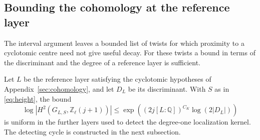\subsection{Bounding the cohomology at the reference layer}
\label{sec:cohom-height}

The interval argument leaves a bounded list of twists for which proximity to a cyclotomic centre need not give useful decay. For these twists a bound in terms of the discriminant and the degree of a reference layer is sufficient.

\begin{proposition}\label{prop:uniform-reference-height}
Let \(L\) be the reference layer satisfying the cyclotomic hypotheses of Appendix~\ref{sec:cohomology}, and let \(D_L\) be its discriminant. With \(S\) as in \eqref{eq:height}, the bound 
\[
 \log|H^2(G_{L,S},\mathbb Z_\ell(j+1))|\le\exp\!\left((2j[L:\mathbb Q])^{C_K}\log(2|D_L|)\right)
\]
 is uniform in the further layers used to detect the degree-one localization kernel. The detecting cycle is constructed
in the next subsection.
\end{proposition}

